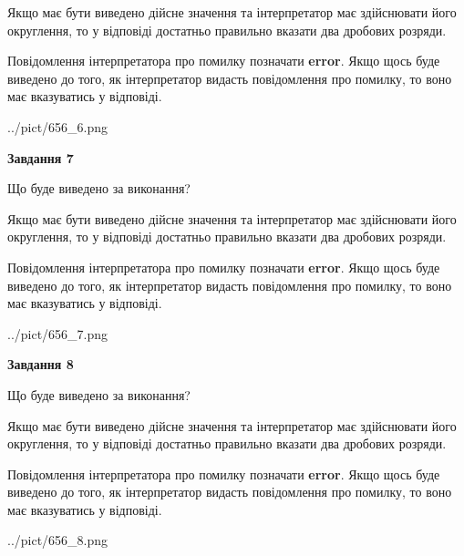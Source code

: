 \documentclass[12pt, ukrainian]{article}
\begin{document}
{\begin {Large}
Якщо має бути виведено дійсне значення та інтерпретатор має здійснювати його округлення, 
то у відповіді достатньо правильно вказати два дробових розряди.

Повідомлення інтерпретатора про помилку позначати \textbf{error}.
Якщо щось буде виведено до того, як інтерпретатор видасть повідомлення про помилку, 
то воно має вказуватись у відповіді. \par

\begin{center}
	{../pict/656_6.png}
\end{center}
\newpage

{\begin {center}\textbf{Завдання 7}\end {center}}\par
Що буде виведено за виконання? \par

Якщо має бути виведено дійсне значення та інтерпретатор має здійснювати його округлення, 
то у відповіді достатньо правильно вказати два дробових розряди.

Повідомлення інтерпретатора про помилку позначати \textbf{error}.
Якщо щось буде виведено до того, як інтерпретатор видасть повідомлення про помилку, 
то воно має вказуватись у відповіді. \par

\begin{center}
	{../pict/656_7.png}
\end{center}
\newpage

{\begin {center}\textbf{Завдання 8}\end {center}}\par
Що буде виведено за виконання? \par

Якщо має бути виведено дійсне значення та інтерпретатор має здійснювати його округлення, 
то у відповіді достатньо правильно вказати два дробових розряди.

Повідомлення інтерпретатора про помилку позначати \textbf{error}.
Якщо щось буде виведено до того, як інтерпретатор видасть повідомлення про помилку, 
то воно має вказуватись у відповіді. \par

\begin{center}
	{../pict/656_8.png}
\end{center}
\newpage


\end{Large}}
\end{document}
